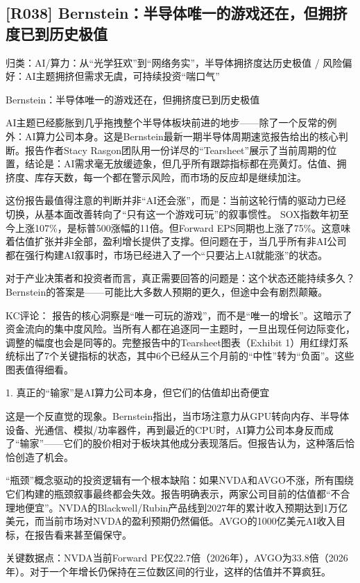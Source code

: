\documentclass[11pt]{ctexart}
\begin{document}
\subsection{[R038] Bernstein：半导体唯一的游戏还在，但拥挤度已到历史极值}
{\small\color{refgray}归类：AI/算力：从“光学狂欢”到“网络务实”，半导体拥挤度达历史极值 / 风险偏好：AI主题拥挤但需求无虞，可持续投资“喘口气”}

Bernstein：半导体唯一的游戏还在，但拥挤度已到历史极值

AI主题已经膨胀到几乎拖拽整个半导体板块前进的地步——除了一个反常的例外：AI算力公司本身。这是Bernstein最新一期半导体周期速览报告给出的核心判断。报告作者Stacy Rasgon团队用一份详尽的“Tearsheet”展示了当前周期的位置，结论是：AI需求毫无放缓迹象，但几乎所有跟踪指标都在亮黄灯。估值、拥挤度、库存天数，每一个都在警示风险，而市场的反应却是继续加注。

这份报告最值得注意的判断并非“AI还会涨”，而是：当前这轮行情的驱动力已经切换，从基本面改善转向了“只有这一个游戏可玩”的叙事惯性。 SOX指数年初至今上涨107\%，是标普500涨幅的11倍。但Forward EPS同期也上涨了75\%。这意味着估值扩张并非全部，盈利增长提供了支撑。但问题在于，当几乎所有非AI公司都在强行构建AI叙事时，市场已经进入了一个“只要沾上AI就能涨”的状态。

对于产业决策者和投资者而言，真正需要回答的问题是：这个状态还能持续多久？Bernstein的答案是——可能比大多数人预期的更久，但途中会有剧烈颠簸。

KC评论： 报告的核心洞察是“唯一可玩的游戏”，而不是“唯一的增长”。这暗示了资金流向的集中度风险。当所有人都在追逐同一主题时，一旦出现任何边际变化，调整的幅度也会是同等的。完整报告中的Tearsheet图表（Exhibit 1）用红绿灯系统标出了7个关键指标的状态，其中6个已经从三个月前的“中性”转为“负面”。这些图表值得细看。

1. 真正的“输家”是AI算力公司本身，但它们的估值却出奇便宜

这是一个反直觉的现象。Bernstein指出，当市场注意力从GPU转向内存、半导体设备、光通信、模拟/功率器件，再到最近的CPU时，AI算力公司本身反而成了“输家”——它们的股价相对于板块其他成分表现落后。但报告认为，这种落后恰恰创造了机会。

“瓶颈”概念驱动的投资逻辑有一个根本缺陷：如果NVDA和AVGO不涨，所有围绕它们构建的瓶颈叙事最终都会失效。报告明确表示，两家公司目前的估值都“不合理地便宜”。NVDA的Blackwell/Rubin产品线到2027年的累计收入预期达到1万亿美元，而当前市场对NVDA的盈利预期仍然偏低。AVGO的1000亿美元AI收入目标，在报告看来甚至偏保守。

关键数据点：NVDA当前Forward PE仅22.7倍（2026年），AVGO为33.8倍（2026年）。对于一个年增长仍保持在三位数区间的行业，这样的估值并不算疯狂。
\end{document}
